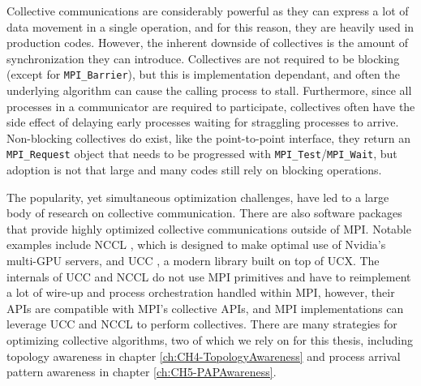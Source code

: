 Collective communications are considerably powerful as they can express a lot of data movement in a single operation, and for this reason, they are heavily used in production codes.
However, the inherent downside of collectives is the amount of synchronization they can introduce.
Collectives are not required to be blocking (except for \texttt{MPI\_Barrier}), but this is implementation dependant, and often the underlying algorithm can cause the calling process to stall.
Furthermore, since all processes in a communicator are required to participate, collectives often have the side effect of delaying early processes waiting for straggling processes to arrive.
Non-blocking collectives do exist, like the point-to-point interface, they return an \texttt{MPI\_Request} object that needs to be progressed with \texttt{MPI\_Test}/\texttt{MPI\_Wait}, but adoption is not that large and many codes still rely on blocking operations.

The popularity, yet simultaneous optimization challenges, have led to a large body of research on collective communication. 
There are also software packages that provide highly optimized collective communications outside of \gls{MPI}.
Notable examples include \gls{NCCL} \cite{NCCL}, which is designed to make optimal use of Nvidia's multi-\gls{GPU} servers, and \gls{UCC} \cite{UCC}, a modern library built on top of \gls{UCX}.
The internals of \gls{UCC} and \gls{NCCL} do not use \gls{MPI} primitives and have to reimplement a lot of wire-up and process orchestration handled within \gls{MPI}, however, their \gls{API}s are compatible with \gls{MPI}'s collective \gls{API}s, and \gls{MPI} implementations can leverage \gls{UCC} and \gls{NCCL} to perform collectives.
There are many strategies for optimizing collective algorithms, two of which we rely on for this thesis, including topology awareness in chapter \ref{ch:CH4-TopologyAwareness} and process arrival pattern awareness in chapter \ref{ch:CH5-PAPAwareness}.


